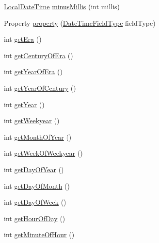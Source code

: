 \begin{DoxyCompactItemize}
\item 
\hyperlink{classorg_1_1joda_1_1time_1_1_local_date_time}{Local\-Date\-Time} \hyperlink{classorg_1_1joda_1_1time_1_1_local_date_time_a35a4462471c3ccfe6b58d6ab4bf46277}{minus\-Millis} (int millis)
\item 
Property \hyperlink{classorg_1_1joda_1_1time_1_1_local_date_time_a187b72c3680112fab44bf3c8c711a720}{property} (\hyperlink{classorg_1_1joda_1_1time_1_1_date_time_field_type}{Date\-Time\-Field\-Type} field\-Type)
\item 
int \hyperlink{classorg_1_1joda_1_1time_1_1_local_date_time_a95d53c47537f679a30ec76000a4277b1}{get\-Era} ()
\item 
int \hyperlink{classorg_1_1joda_1_1time_1_1_local_date_time_a42eb21d2f1abd64e1b8f6197b62b7240}{get\-Century\-Of\-Era} ()
\item 
int \hyperlink{classorg_1_1joda_1_1time_1_1_local_date_time_abea2b35ff468f783e5d85dc0254509e3}{get\-Year\-Of\-Era} ()
\item 
int \hyperlink{classorg_1_1joda_1_1time_1_1_local_date_time_af9f2d3aad18517992965c96ad3935c56}{get\-Year\-Of\-Century} ()
\item 
int \hyperlink{classorg_1_1joda_1_1time_1_1_local_date_time_a34bb4c3abed51c1be0a911a2ad3858f7}{get\-Year} ()
\item 
int \hyperlink{classorg_1_1joda_1_1time_1_1_local_date_time_aae751cfa6cd4889ccea481b4378f9a8f}{get\-Weekyear} ()
\item 
int \hyperlink{classorg_1_1joda_1_1time_1_1_local_date_time_a8b1229ea7b4848cdbde09bc44c5d956c}{get\-Month\-Of\-Year} ()
\item 
int \hyperlink{classorg_1_1joda_1_1time_1_1_local_date_time_a6340361c6130d1ed5968408f3b11d074}{get\-Week\-Of\-Weekyear} ()
\item 
int \hyperlink{classorg_1_1joda_1_1time_1_1_local_date_time_a9e9037cc7dc0f7f5bf85d316e80dfe22}{get\-Day\-Of\-Year} ()
\item 
int \hyperlink{classorg_1_1joda_1_1time_1_1_local_date_time_a9f7d8b7ff798e9655f8f27e9f30a509d}{get\-Day\-Of\-Month} ()
\item 
int \hyperlink{classorg_1_1joda_1_1time_1_1_local_date_time_a622c06680acca89c8c544b6d4b349bd5}{get\-Day\-Of\-Week} ()
\item 
int \hyperlink{classorg_1_1joda_1_1time_1_1_local_date_time_a2632aa72a1b3729845977449ce7c3364}{get\-Hour\-Of\-Day} ()
\item 
int \hyperlink{classorg_1_1joda_1_1time_1_1_local_date_time_a9d9bcba728233ae58816376025404023}{get\-Minute\-Of\-Hour} ()

\end{DoxyCompactItemize}

